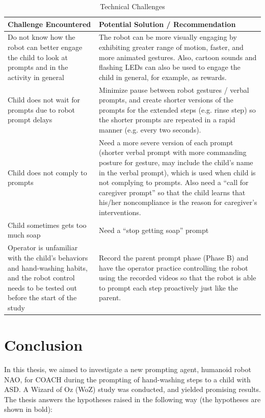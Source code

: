 \documentclass{ut-thesis}
\begin{document}
\begin{table}[H]
	\centering
	\begin{tabular}{ | p{5cm} | p{10cm} | }
		\hline
		\textbf{Challenge Encountered}	&	\textbf{Potential Solution / Recommendation} \\	\hline
		Do not know how the robot can better engage the child to look at prompts and in the activity in general	&	The robot can be more visually engaging by exhibiting greater range of motion, faster, and more animated gestures.  Also, cartoon sounds and flashing LEDs can also be used to engage the child in general, for example, as rewards.	\\	\hline
		Child does not wait for prompts due to robot prompt delays	&	Minimize pause between robot gestures / verbal prompts, and create shorter versions of the prompts for the extended steps (e.g. rinse step) so the shorter prompts are repeated in a rapid manner (e.g. every two seconds).	\\	\hline
		Child does not comply to prompts	&	Need a more severe version of each prompt (shorter verbal prompt with more commanding posture for gesture, may include the child's name in the verbal prompt), which is used when child is not complying to prompts.  Also need a “call for caregiver prompt” so that the child learns that his/her noncompliance is the reason for caregiver's interventions.	\\	\hline
		Child sometimes gets too much soap	&	Need a “stop getting soap” prompt	\\	\hline
		Operator is unfamiliar with the child's behaviors and hand-washing habits, and the robot control needs to be tested out before the start of the study	&	Record the parent prompt phase (Phase B) and have the operator practice controlling the robot using the recorded videos so that the robot is able to prompt each step proactively just like the parent.	\\	\hline
	\end{tabular}
	\caption{Technical Challenges}
	\label{tab:TechnicalChallenge}
\end{table}


\chapter{Conclusion}
In this thesis, we aimed to investigate a new prompting agent, humanoid robot NAO, for COACH during the prompting of hand-washing steps to a child with ASD.  A Wizard of Oz (WoZ) study was conducted, and yielded promising results.
The thesis answers the hypotheses raised in the following way (the hypotheses are shown in bold):
\end{document}

